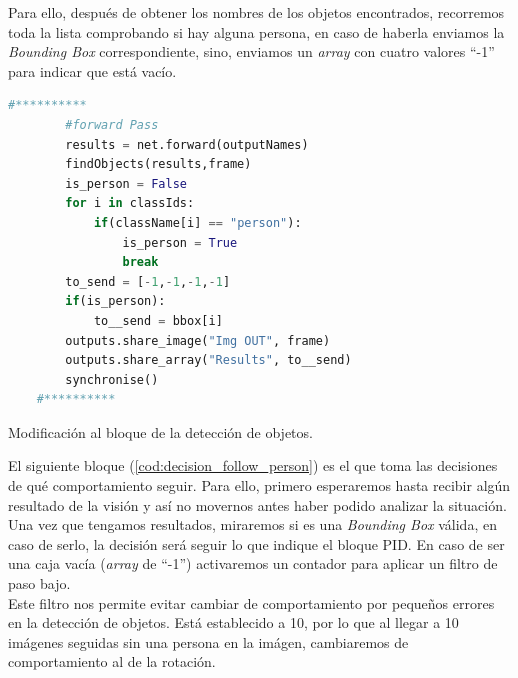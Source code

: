 Para ello, después de obtener los nombres de los objetos encontrados, recorremos toda la lista comprobando si hay alguna persona,
en caso de haberla enviamos la \textit{Bounding Box} correspondiente, sino, enviamos un \textit{array} con cuatro valores ``-1'' para indicar que está vacío.

\begin{code}[H]
    \begin{lstlisting}[language=python]
    #**********
        #forward Pass
        results = net.forward(outputNames)
        findObjects(results,frame)
        is_person = False
        for i in classIds:
            if(className[i] == "person"):
                is_person = True
                break
        to_send = [-1,-1,-1,-1]
        if(is_person):
            to__send = bbox[i]
        outputs.share_image("Img OUT", frame)
        outputs.share_array("Results", to__send)
        synchronise()
    #**********
    \end{lstlisting}
    \caption[Modificación al bloque detector de objetos]{Modificación al bloque de la detección de objetos.}
    \label{cod:mod_object_detector}
\end{code}

El siguiente bloque (\ref{cod:decision_follow_person}) es el que toma las decisiones de qué comportamiento seguir.
Para ello, primero esperaremos hasta recibir algún resultado de la visión y así no movernos antes haber podido analizar la situación.\\
Una vez que tengamos resultados, miraremos si es una \textit{Bounding Box} válida, en caso de serlo, la decisión será seguir lo que indique el bloque PID.
En caso de ser una caja vacía (\textit{array} de ``-1'') activaremos un contador para aplicar un filtro de paso bajo.\\
Este filtro nos permite evitar cambiar de comportamiento por pequeños errores en la detección de objetos.
Está establecido a 10, por lo que al llegar a 10 imágenes seguidas sin una persona en la imágen, cambiaremos de comportamiento al de la rotación.\\

